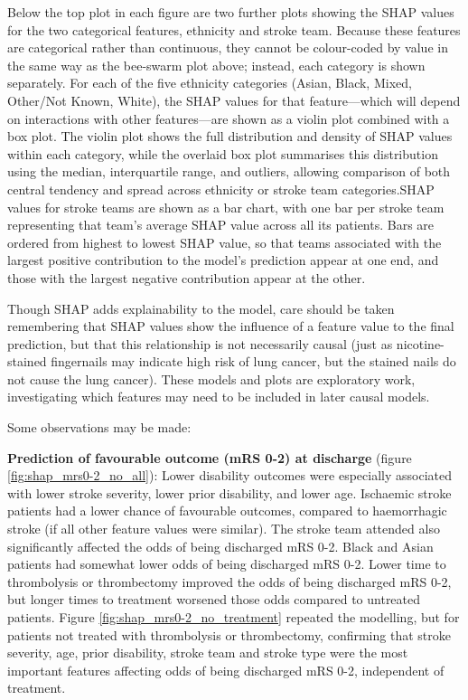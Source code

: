 Below the top plot in each figure are two further plots showing the SHAP values for the two categorical features, ethnicity and stroke team. Because these features are categorical rather than continuous, they cannot be colour-coded by value in the same way as the bee-swarm plot above; instead, each category is shown separately. For each of the five ethnicity categories (Asian, Black, Mixed, Other/Not Known, White), the SHAP values for that feature—which will depend on interactions with other features—are shown as a violin plot combined with a box plot. The violin plot shows the full distribution and density of SHAP values within each category, while the overlaid box plot summarises this distribution using the median, interquartile range, and outliers, allowing comparison of both central tendency and spread across ethnicity or stroke team categories.SHAP values for stroke teams are shown as a bar chart, with one bar per stroke team representing that team's average SHAP value across all its patients. Bars are ordered from highest to lowest SHAP value, so that teams associated with the largest positive contribution to the model's prediction appear at one end, and those with the largest negative contribution appear at the other.

Though SHAP adds explainability to the model, care should be taken remembering that SHAP values show the influence of a feature value to the final prediction, but that this relationship is not necessarily causal (just as nicotine-stained fingernails may indicate high risk of lung cancer, but the stained nails do not cause the lung cancer). These models and plots are exploratory work, investigating which features may need to be included in later causal models.

Some observations may be made:

\textbf{Prediction of favourable outcome (mRS 0-2) at discharge} (figure \ref{fig:shap_mrs0-2_no_all}): Lower disability outcomes were especially associated with lower stroke severity, lower prior disability, and lower age. Ischaemic stroke patients had a lower chance of favourable outcomes, compared to haemorrhagic stroke (if all other feature values were similar). The stroke team attended also significantly affected the odds of being discharged mRS 0-2. Black and Asian patients had somewhat lower odds of being discharged mRS 0-2. Lower time to thrombolysis or thrombectomy improved the odds of being discharged mRS 0-2, but longer times to treatment worsened those odds compared to untreated patients. Figure \ref{fig:shap_mrs0-2_no_treatment} repeated the modelling, but for patients not treated with thrombolysis or thrombectomy, confirming that stroke severity, age, prior disability, stroke team and stroke type were the most important features affecting odds of being discharged mRS 0-2, independent of treatment.

